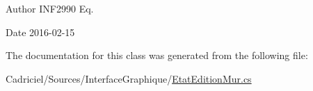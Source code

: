 \begin{DoxyAuthor}{Author}
I\+N\+F2990 Eq. 
\end{DoxyAuthor}
\begin{DoxyDate}{Date}
2016-\/02-\/15 
\end{DoxyDate}


The documentation for this class was generated from the following file\+:\begin{DoxyCompactItemize}
\item 
Cadriciel/\+Sources/\+Interface\+Graphique/\hyperlink{_etat_edition_mur_8cs}{Etat\+Edition\+Mur.\+cs}\end{DoxyCompactItemize}
